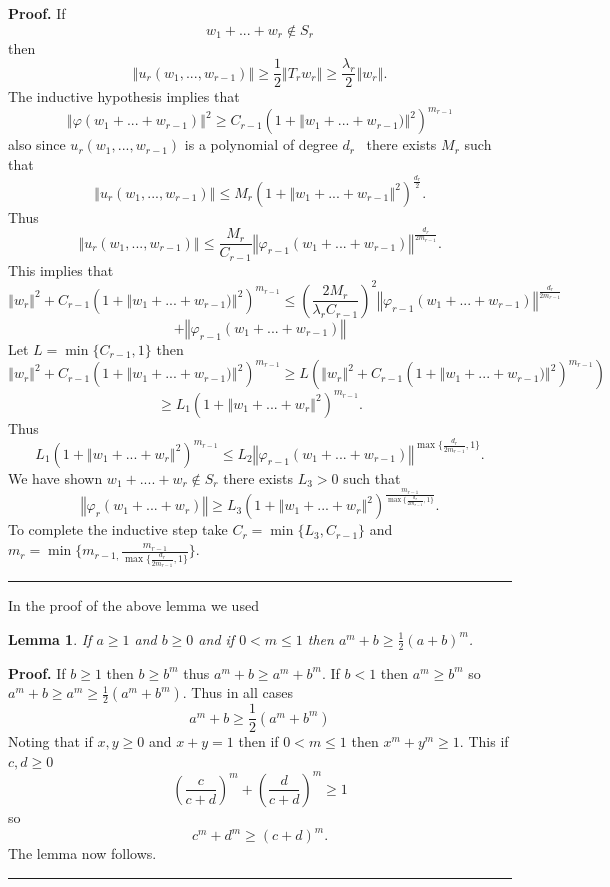 \documentclass[12pt]{article}%
\newtheorem{lemma}[theorem]{Lemma}
\newenvironment{proof}[1][Proof]{\noindent\textbf{#1.} }{\ \rule{0.5em}{0.5em}}
\begin{document}
\begin{proof}
If
\[
w_{1}+...+w_{r}\notin S_{r}
\]
then%
\[
\left\Vert u_{r}(w_{1},...,w_{r-1})\right\Vert \geq\frac{1}{2}\left\Vert
T_{r}w_{r}\right\Vert \geq\frac{\lambda_{r}}{2}\left\Vert w_{r}\right\Vert .
\]
The inductive hypothesis implies that
\[
\left\Vert \varphi(w_{1}+...+w_{r-1})\right\Vert ^{2}\geq C_{r-1}(1+\left\Vert
w_{1}+...+w_{r-1})\right\Vert ^{2})^{m_{r-1}}
\]
also since $u_{r}(w_{1},...,w_{r-1})$ is a polynomial of degree $d_{r}$
\ there exists $M_{r}$ such that
\[
\left\Vert u_{r}(w_{1},...,w_{r-1})\right\Vert \leq M_{r}(1+\left\Vert
w_{1}+...+w_{r-1}\right\Vert ^{2})^{\frac{d_{r}}{2}}.
\]
Thus
\[
\left\Vert u_{r}(w_{1},...,w_{r-1})\right\Vert \leq\frac{M_{r}}{C_{r-1}%
}\left\Vert \varphi_{r-1}(w_{1}+...+w_{r-1})\right\Vert ^{\frac{d_{r}%
}{2m_{r-1}}}.
\]
This implies that
\[
\left\Vert w_{r}\right\Vert ^{2}+C_{r-1}(1+\left\Vert w_{1}+...+w_{r-1}%
)\right\Vert ^{2})^{m_{r-1}}\leq\left(  \frac{2M_{r}}{\lambda_{r}C_{r-1}%
}\right)  ^{2}\left\Vert \varphi_{r-1}(w_{1}+...+w_{r-1})\right\Vert
^{\frac{d_{r}}{2m_{r-1}}}
\]%
\[
+\left\Vert \varphi_{r-1}(w_{1}+...+w_{r-1})\right\Vert
\]
Let $L=\min\{C_{r-1},1\}$ then
\[
\left\Vert w_{r}\right\Vert ^{2}+C_{r-1}(1+\left\Vert w_{1}+...+w_{r-1}%
)\right\Vert ^{2})^{m_{r-1}}\geq L(\left\Vert w_{r}\right\Vert ^{2}%
+C_{r-1}(1+\left\Vert w_{1}+...+w_{r-1})\right\Vert ^{2})^{m_{r-1}})
\]%
\[
\geq L_{1}(1+\left\Vert w_{1}+...+w_{r}\right\Vert ^{2})^{m_{r-1}}.
\]
Thus
\[
L_{1}(1+\left\Vert w_{1}+...+w_{r}\right\Vert ^{2})^{m_{r-1}}\leq
L_{2}\left\Vert \varphi_{r-1}(w_{1}+...+w_{r-1})\right\Vert ^{\max
\{\frac{d_{r}}{2m_{r-1}},1\}}.
\]
We have shown $w_{1}+....+w_{r}\notin S_{r}$ there exists $L_{3}>0$ such that%
\[
\left\Vert \varphi_{r}(w_{1}+...+w_{r})\right\Vert \geq L_{3}(1+\left\Vert
w_{1}+...+w_{r}\right\Vert ^{2})^{\frac{m_{r-1}}{\max\{\frac{d_{r}}{2m_{r-1}%
},1\}}}.
\]
To complete the inductive step take $C_{r}=\min\{L_{3},C_{r-1}\}$ and
$m_{r}=\min\{m_{r-1,}\frac{m_{r-1}}{\max\{\frac{d_{r}}{2m_{r-1}},1\}}\}$.
\end{proof}

In the proof of the above lemma we used

\begin{lemma}
\label{trivial}If $a\geq1$ and $b\geq0$ and if $0<m\leq1$ then $a^{m}%
+b\geq\frac{1}{2}(a+b)^{m}$.
\end{lemma}

\begin{proof}
If $b\geq1$ then $b\geq b^{m}$ thus $a^{m}+b\geq a^{m}+b^{m}$. If $b<1$ then
$a^{m}\geq b^{m}$ so $a^{m}+b\geq a^{m}\geq\frac{1}{2}(a^{m}+b^{m})$. Thus in
all cases%
\[
a^{m}+b\geq\frac{1}{2}(a^{m}+b^{m})
\]
Noting that if $x,y\geq0$ and $x+y=1$ then if $0<m\leq1$ then $x^{m}+y^{m}%
\geq1.$ This if $c,d\geq0$%
\[
\left(  \frac{c}{c+d}\right)  ^{m}+\left(  \frac{d}{c+d}\right)  ^{m}\geq1
\]
so
\[
c^{m}+d^{m}\geq(c+d)^{m}.
\]
The lemma now follows.
\end{proof}
\end{document}
